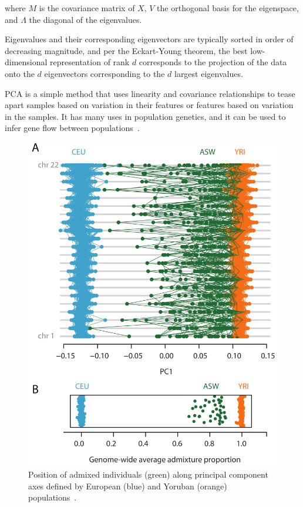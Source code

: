 \documentclass{essay}
\begin{document}
where $M$ is the covariance matrix of $X$, $V$ the orthogonal basis for the
eigenspace, and $\Lambda$ the diagonal of the eigenvalues.

Eigenvalues and their corresponding eigenvectors are typically sorted in order
of decreasing magnitude, and per the Eckart-Young theorem, the best
low-dimensional representation of rank $d$ corresponds to the projection of the
data onto the $d$ eigenvectors corresponding to the $d$ largest eigenvalues.

PCA is a simple method that uses linearity and covariance relationships to
tease apart samples based on variation in their features or features based on
variation in the samples. It has many uses in population genetics, and it can
be used to infer gene flow between populations~\cite{mcvean_genealogical_2009}.

\begin{figure}
  \includegraphics[width=\linewidth,keepaspectratio]{../Figures/fig3.png}
  \caption{Position of admixed individuals (green) along principal
    component axes defined by European (blue) and Yoruban (orange)
    populations~\cite{mcvean_genealogical_2009}.}
\end{figure}
\end{document}
